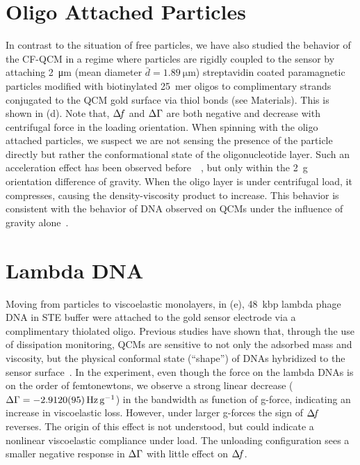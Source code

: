 \section{Oligo Attached Particles}
In contrast to the situation of free particles, we have also studied the
behavior of the CF-QCM in a regime where particles are rigidly coupled to
the sensor by attaching \SI{2}{\micro\meter} (mean diameter
$\bar{d}=\SI{1.89}{\micro\meter}$) streptavidin coated paramagnetic
particles modified with biotinylated \SI{25}{mer} oligos to complimentary
strands conjugated to the QCM gold surface via thiol bonds (see
Materials).  This is shown in (d).  Note
that, $\Delta\!f$ and $\Delta\Gamma$ are both negative and decrease
with centrifugal force in the loading orientation.  
When spinning with the oligo attached
particles, we suspect we are not sensing the presence of the particle
directly but rather the conformational state of the oligonucleotide layer.
Such an acceleration effect has been observed
before~\cite{yoshimoto2002effect}~\cite{fawcett2004evidence}, but only
within the \SI{2}{g} orientation difference of gravity.  When the oligo
layer is under centrifugal load, it compresses, causing the
density-viscosity product to increase.  This behavior is consistent with
the behavior of DNA observed on QCMs under the influence of gravity
alone~\cite{fawcett2004evidence}.

\section{Lambda DNA}
Moving from particles to viscoelastic monolayers, in
(e), \SI{48}{kbp} lambda phage DNA in STE buffer were
attached to the gold sensor electrode via a complimentary thiolated oligo.  Previous studies have shown that,
through the use of dissipation monitoring, QCMs are sensitive to not only
the adsorbed mass and viscosity, but the physical conformal state
(``shape'') of DNAs hybridized to the sensor
surface~\cite{tsortos2008shear}.  In the experiment, even though the force
on the lambda DNAs is on the order of femtonewtons, we observe a strong
linear decrease ($\dg=\SI{-2.912+-0.0095}{\hertz\per\g}$) in the
bandwidth as function of g-force, indicating an
increase in viscoelastic loss.  However, under larger g-forces the sign of
$\Delta\!f$ reverses.  The origin of this effect is not understood, but
could indicate a nonlinear viscoelastic compliance under load.  The
unloading configuration sees a smaller negative response in $\Delta\Gamma$ with little
effect on $\Delta\!f$.

